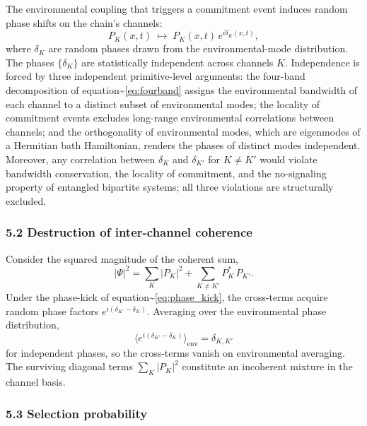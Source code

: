 \documentclass[
  11pt,
]{article}
\begin{document}
The environmental coupling that triggers a commitment event induces
random phase shifts on the chain's channels: \begin{equation}
  P_K(x,t) \;\longmapsto\; P_K(x,t) \, e^{i \delta_K(x,t)},
  \label{eq:phase_kick}
\end{equation} where \(\delta_K\) are random phases drawn from the
environmental-mode distribution. The phases \(\{\delta_K\}\) are
statistically independent across channels \(K\). Independence is forced
by three independent primitive-level arguments: the four-band
decomposition of equation\textasciitilde{}\eqref{eq:fourband} assigns
the environmental bandwidth of each channel to a distinct subset of
environmental modes; the locality of commitment events excludes
long-range environmental correlations between channels; and the
orthogonality of environmental modes, which are eigenmodes of a
Hermitian bath Hamiltonian, renders the phases of distinct modes
independent. Moreover, any correlation between \(\delta_K\) and
\(\delta_{K'}\) for \(K \neq K'\) would violate bandwidth conservation,
the locality of commitment, and the no-signaling property of entangled
bipartite systems; all three violations are structurally excluded.

\subsubsection{5.2 Destruction of inter-channel
coherence}\label{destruction-of-inter-channel-coherence}

Consider the squared magnitude of the coherent sum, \begin{equation}
  |\Psi|^2 = \sum_K |P_K|^2 + \sum_{K \neq K'} P_K^* \, P_{K'}.
\end{equation} Under the phase-kick of
equation\textasciitilde{}\eqref{eq:phase_kick}, the cross-terms acquire
random phase factors \(e^{i(\delta_{K'} - \delta_K)}\). Averaging over
the environmental phase distribution, \begin{equation}
  \langle e^{i(\delta_{K'} - \delta_K)} \rangle_{\mathrm{env}} = \delta_{K,K'}
\end{equation} for independent phases, so the cross-terms vanish on
environmental averaging. The surviving diagonal terms \(\sum_K |P_K|^2\)
constitute an incoherent mixture in the channel basis.

\subsubsection{5.3 Selection probability}\label{selection-probability}
\end{document}
